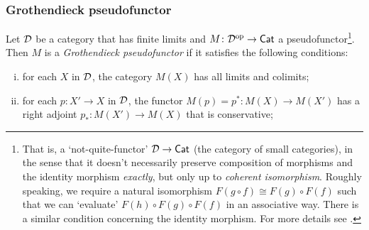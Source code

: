 





    \subsubsection{Grothendieck pseudofunctor} %
    \label{ssub:a_useful_pseudofunctor}
    
        \begin{definition}\label{df:m-t-grothendieck-setup}
            Let $\mathcal{D}$ be a category that has finite limits and $M\colon{\mathcal{D}}^{\mathrm{op}}\to\mathsf{Cat}$ a pseudofunctor\footnote{
                That is, a `not-quite-functor' $\mathcal{D}\to\mathsf{Cat}$ (the category of small categories), in the sense that it doesn't necessarily preserve composition of morphisms and the identity morphism \emph{exactly}, but only up to \emph{coherent isomorphism}.
                Roughly speaking, we require a natural isomorphism $F(g\circ f)\cong F(g)\circ F(f)$ such that we can `evaluate' $F(h)\circ F(g)\circ F(f)$ in an associative way.
                There is a similar condition concerning the identity morphism.
                For more details see \cite[Definition~7.5.1, \S7.5, p.296]{Borceux:1994ws}.
            }.
            Then $M$ is a \emph{Grothendieck pseudofunctor} if it satisfies the following conditions:
            \begin{enumerate}[(i)]
                \item for each $X$ in $\mathcal{D}$, the category $M(X)$ has all limits and colimits;
                \item for each $p\colon X'\to X$ in $\mathcal{D}$, the functor $M(p)=p^*\colon M(X)\to M(X')$ has a right adjoint $p_*\colon M(X')\to M(X)$ that is conservative;

\end{enumerate}
\end{definition}
